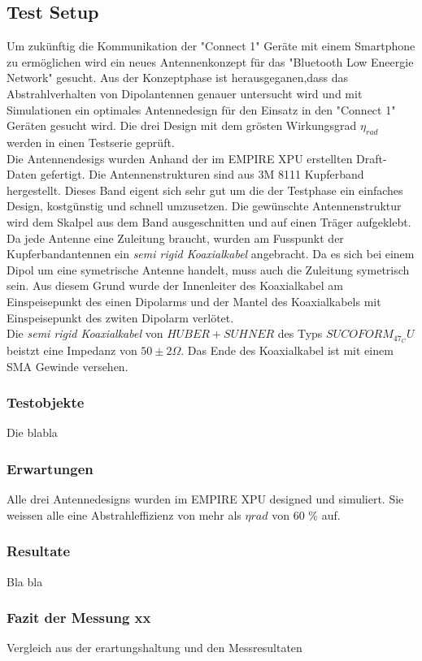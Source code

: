 \subsection{Test Setup}
Um zukünftig die Kommunikation der "Connect 1" Geräte mit einem Smartphone zu ermöglichen wird ein neues Antennenkonzept für das "Bluetooth Low Eneergie Network" gesucht. Aus der Konzeptphase ist herausgeganen,dass das Abstrahlverhalten von Dipolantennen genauer untersucht wird und mit Simulationen ein optimales Antennedesign für den Einsatz in den "Connect 1" Geräten gesucht wird. Die drei Design mit dem grösten Wirkungsgrad $\eta_{rad}$ werden in einen Testserie geprüft.\\
Die Antennendesigs wurden Anhand der im EMPIRE XPU erstellten Draft-Daten gefertigt. Die Antennenstrukturen sind aus 3M 8111 Kupferband hergestellt. Dieses Band eigent sich sehr gut um die der Testphase ein einfaches Design, kostgünstig und schnell umzusetzen. Die gewünschte Antennenstruktur wird dem Skalpel aus dem Band ausgeschnitten und auf einen Träger aufgeklebt. \\
Da jede Antenne eine Zuleitung braucht, wurden am Fusspunkt der Kupferbandantennen ein \textit{semi rigid Koaxialkabel} angebracht. Da es sich bei einem Dipol um eine symetrische Antenne handelt, muss auch die Zuleitung symetrisch sein. Aus diesem Grund wurde der Innenleiter des Koaxialkabel am Einspeisepunkt des einen Dipolarms und der Mantel des Koaxialkabels mit Einspeisepunkt des zwiten Dipolarm verlötet.\\
Die \textit{semi rigid Koaxialkabel} von $HUBER+SUHNER$ des Typs $SUCOFORM_47_CU$ beistzt eine Impedanz von $50  \pm 2\Omega$. Das Ende des Koaxialkabel ist mit einem SMA Gewinde versehen.\\

\subsubsection{Testobjekte}
Die  blabla
\subsubsection{Erwartungen}
Alle drei Antennedesigns wurden im EMPIRE XPU designed und simuliert. Sie weissen alle eine Abstrahleffizienz von mehr als $\eta{rad}$ von 60 $\%$ auf. 
\subsubsection{Resultate}
Bla bla
\subsubsection{Fazit der Messung xx}
Vergleich aus der erartungshaltung und den Messresultaten